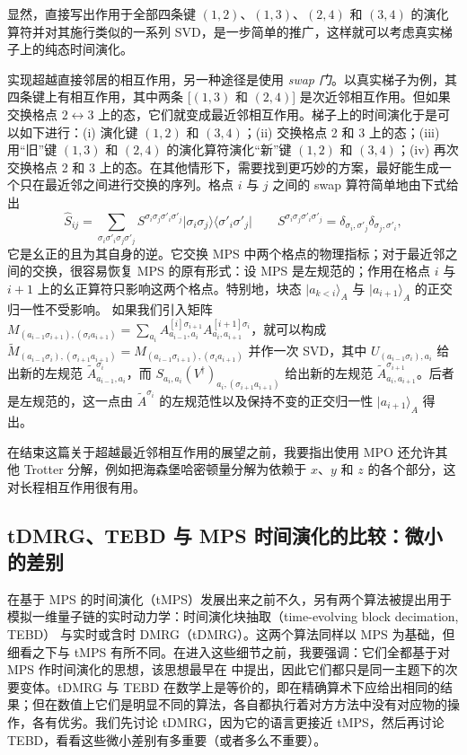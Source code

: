 \documentclass[a4paper,10pt,oneside,onecolumn,1p,times]{elsarticle}
\newcommand{\bra}[1]{\mbox{$\langle #1  |$}}
\newcommand{\ket}[1]{\mbox{$| #1  \rangle$}}
\begin{document}
显然，直接写出作用于全部四条键 $(1,2)$、$(1,3)$、$(2,4)$ 和 $(3,4)$ 的演化算符并对其施行类似的一系列 SVD，是一步简单的推广，这样就可以考虑真实梯子上的纯态时间演化。 

实现超越直接邻居的相互作用，另一种途径是使用 {\em swap 门}\cite{Stoudenmire10}。以真实梯子为例，其四条键上有相互作用，其中两条 [$(1,3)$ 和 $(2,4)$] 是次近邻相互作用。但如果交换格点 $2 \leftrightarrow 3$ 上的态，它们就变成最近邻相互作用。梯子上的时间演化于是可以如下进行：(i) 演化键 $(1,2)$ 和 $(3,4)$；(ii) 交换格点 2 和 3 上的态；(iii) 用``旧''键 $(1,3)$ 和 $(2,4)$ 的演化算符演化``新''键 $(1,2)$ 和 $(3,4)$；(iv) 再次交换格点 2 和 3 上的态。在其他情形下，需要找到更巧妙的方案，最好能生成一个只在最近邻之间进行交换的序列。格点 $i$ 与 $j$ 之间的 swap 算符简单地由下式给出
\begin{equation}
\hat{S}_{ij} = \sum_{\sigma_i\sigma'_i \sigma_j\sigma'_j} S^{\sigma_i\sigma_j \sigma'_i \sigma'_j} \ket{\sigma_i\sigma_j}\bra{\sigma'_i\sigma'_j} \quad\quad 
S^{\sigma_i\sigma_j \sigma'_i \sigma'_j} = \delta_{\sigma_i,\sigma'_j} \delta_{\sigma_j,\sigma'_i},
\end{equation}
它是幺正的且为其自身的逆。它交换 MPS 中两个格点的物理指标；对于最近邻之间的交换，很容易恢复 MPS 的原有形式：设 MPS 是左规范的；作用在格点 $i$ 与 $i+1$ 上的幺正算符只影响这两个格点。特别地，块态 $\ket{a_{k<i}}_A$ 与 $\ket{a_{i+1}}_A$ 的正交归一性不受影响。
如果我们引入矩阵 $M_{(a_{i-1}\sigma_{i+1}),(\sigma_i a_{i+1})} = \sum_{a_i} A^{[i]\sigma_{i+1}}_{a_{i-1},a_i} A^{[i+1]\sigma_i}_{a_i,a_{i+1}}$，就可以构成 $\tilde{M}_{(a_{i-1}\sigma_i),(\sigma_{i+1}a_{i+1})}=M_{(a_{i-1}\sigma_{i+1}),(\sigma_i a_{i+1})}$ 并作一次 SVD，其中 $U_{(a_{i-1}\sigma_i),a_i}$ 给出新的左规范 $\tilde{A}^{\sigma_i}_{a_{i-1},a_i}$，而
$S_{a_i,a_i} (V^\dagger)_{a_i,(\sigma_{i+1}a_{i+1})}$ 给出新的左规范 $\tilde{A}^{\sigma_{i+1}}_{a_{i},a_{i+1}}$。后者是左规范的，这一点由 $\tilde{A}^{\sigma_i}$ 的左规范性以及保持不变的正交归一性 $\ket{a_{i+1}}_A$ 得出。

在结束这篇关于超越最近邻相互作用的展望之前，我要指出使用 MPO 还允许其他 Trotter 分解，例如把海森堡哈密顿量分解为依赖于 $x$、$y$ 和 $z$ 的各个部分，这对长程相互作用很有用\cite{VerstraetePirvu08}。 
 

\subsection{tDMRG、TEBD 与 MPS 时间演化的比较：微小的差别}
在基于 MPS 的时间演化（tMPS）发展出来之前不久，另有两个算法被提出用于模拟一维量子链的实时动力学：时间演化块抽取（time-evolving block decimation, TEBD）\cite{Vidal03a,Vidal04b} 与实时或含时 DMRG（tDMRG）\cite{Daley04,WhiteFeiguin04}。这两个算法同样以 MPS 为基础，但细看之下与 tMPS 有所不同。在进入这些细节之前，我要强调：它们全都基于对 MPS 作时间演化的思想，该思想最早在 \cite{Vidal03a,Vidal04b} 中提出，因此它们都只是同一主题下的次要变体。tDMRG 与 TEBD 在数学上是等价的，即在精确算术下应给出相同的结果；但在数值上它们是明显不同的算法，各自都执行着对方方法中没有对应物的操作，各有优劣。我们先讨论 tDMRG，因为它的语言更接近 tMPS，然后再讨论 TEBD，看看这些微小差别有多重要（或者多么不重要）。
\end{document}
